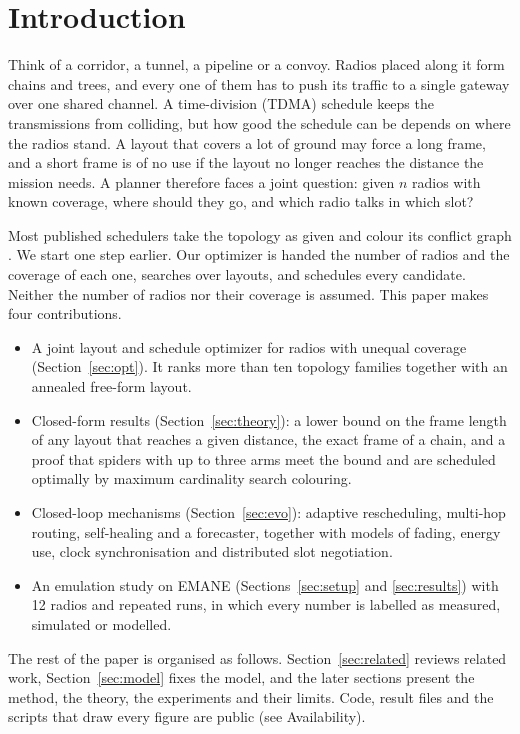 \documentclass[conference]{IEEEtran}
\begin{document}
\section{Introduction}\label{sec:intro}
Think of a corridor, a tunnel, a pipeline or a convoy. Radios placed along it form chains and trees, and every one of them has to push its traffic to a single gateway over one shared channel. A time-division (TDMA) schedule keeps the transmissions from colliding, but how good the schedule can be depends on where the radios stand. A layout that covers a lot of ground may force a long frame, and a short frame is of no use if the layout no longer reaches the distance the mission needs. A planner therefore faces a joint question: given $n$ radios with known coverage, where should they go, and which radio talks in which slot?

Most published schedulers take the topology as given and colour its conflict graph \cite{ramanathan1993,rhee2009,incel2012}. We start one step earlier. Our optimizer is handed the number of radios and the coverage of each one, searches over layouts, and schedules every candidate. Neither the number of radios nor their coverage is assumed. This paper makes four contributions.

\begin{itemize}
\item A joint layout and schedule optimizer for radios with unequal coverage (Section~\ref{sec:opt}). It ranks more than ten topology families together with an annealed free-form layout.
\item Closed-form results (Section~\ref{sec:theory}): a lower bound on the frame length of any layout that reaches a given distance, the exact frame of a chain, and a proof that spiders with up to three arms meet the bound and are scheduled optimally by maximum cardinality search colouring.
\item Closed-loop mechanisms (Section~\ref{sec:evo}): adaptive rescheduling, multi-hop routing, self-healing and a forecaster, together with models of fading, energy use, clock synchronisation and distributed slot negotiation.
\item An emulation study on EMANE (Sections~\ref{sec:setup} and \ref{sec:results}) with 12 radios and \nRuns{} repeated runs, in which every number is labelled as measured, simulated or modelled.
\end{itemize}
The rest of the paper is organised as follows. Section~\ref{sec:related} reviews related work, Section~\ref{sec:model} fixes the model, and the later sections present the method, the theory, the experiments and their limits. Code, result files and the scripts that draw every figure are public (see Availability).
\end{document}
